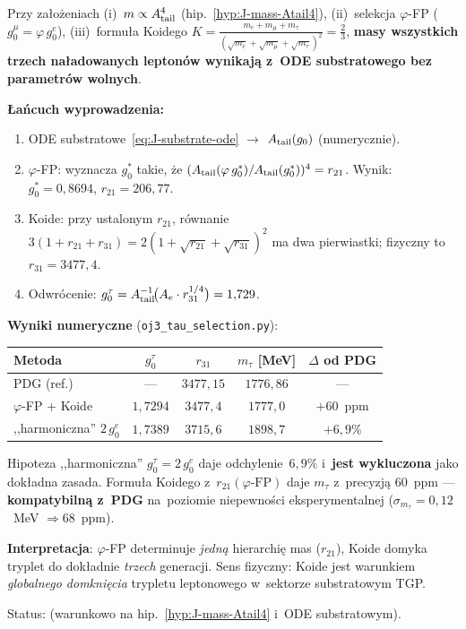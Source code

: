 \begin{proposition}%
\label{prop:J-koide-chain}
Przy założeniach (i)~$m \propto A_{\rm tail}^4$
(hip.~\ref{hyp:J-mass-Atail4}), (ii)~selekcja $\varphi$-FP
($g_0^\mu = \varphi\,g_0^e$), (iii)~formuła Koidego
$K = \frac{m_e+m_\mu+m_\tau}{(\sqrt{m_e}+\sqrt{m_\mu}+\sqrt{m_\tau})^2} = \tfrac{2}{3}$,
\textbf{masy wszystkich trzech naładowanych leptonów wynikają z~ODE substratowego
bez parametrów wolnych}.

\medskip\noindent\textbf{Łańcuch wyprowadzenia:}
\begin{enumerate}[nosep]
\item ODE substratowe~\eqref{eq:J-substrate-ode} $\to$ $A_{\rm tail}(g_0)$ (numerycznie).
\item $\varphi$-FP: wyznacza $g_0^*$ takie, że
      $(A_{\rm tail}(\varphi\,g_0^*)/A_{\rm tail}(g_0^*))^4 = r_{21}$.
      Wynik: $g_0^* = 0{,}8694$, $r_{21} = 206{,}77$.
\item Koide: przy ustalonym $r_{21}$, równanie
      $3(1 + r_{21} + r_{31}) = 2(1 + \sqrt{r_{21}} + \sqrt{r_{31}})^2$
      ma dwa pierwiastki; fizyczny to $r_{31} = 3477{,}4$.
\item Odwrócenie: $g_0^\tau = A_{\rm tail}^{-1}\!\bigl(A_e \cdot r_{31}^{1/4}\bigr) = 1{,}729$.
\end{enumerate}

\medskip\noindent\textbf{Wyniki numeryczne} (\texttt{oj3\_tau\_selection.py}):
\begin{center}\footnotesize
\begin{tabular}{@{}lcccc@{}}
\toprule
  Metoda & $g_0^\tau$ & $r_{31}$ & $m_\tau$ [MeV] & $\Delta$ od PDG \\
\midrule
  PDG (ref.) & --- & $3477{,}15$ & $1776{,}86$ & --- \\
  $\varphi$-FP + Koide & $1{,}7294$ & $3477{,}4$ & $1777{,}0$ & $+60$~ppm \\
  ,,harmoniczna'' $2\,g_0^e$ & $1{,}7389$ & $3715{,}6$ & $1898{,}7$ & $+6{,}9\%$ \\
\bottomrule
\end{tabular}
\end{center}

\medskip\noindent
Hipoteza ,,harmoniczna'' $g_0^\tau = 2\,g_0^e$ daje odchylenie~$6{,}9\%$
i~\textbf{jest wykluczona} jako dokładna zasada.
Formuła Koidego z~$r_{21}(\varphi\text{-FP})$ daje $m_\tau$ z~precyzją
$60$~ppm --- \textbf{kompatybilną z~PDG} na~poziomie niepewności eksperymentalnej
($\sigma_{m_\tau} = 0{,}12$~MeV $\Rightarrow 68$~ppm).

\medskip\noindent
\textbf{Interpretacja}: $\varphi$-FP determinuje \emph{jedną} hierarchię mas ($r_{21}$),
Koide domyka tryplet do dokładnie \emph{trzech} generacji.
Sens fizyczny: Koide jest warunkiem \emph{globalnego domknięcia}
trypletu leptonowego w~sektorze substratowym TGP.

Status:  (warunkowo na hip.~\ref{hyp:J-mass-Atail4}
i~ODE substratowym).
\end{proposition}

